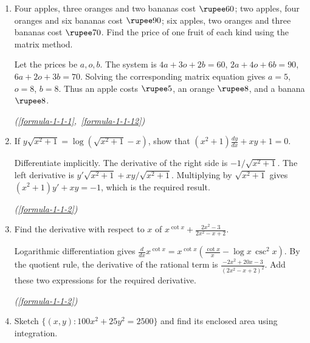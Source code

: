 \begin{enumerate}[label={},leftmargin=1.15cm,labelwidth=1.0cm,labelsep=0.15cm,itemindent=0pt,listparindent=0pt,itemsep=\baselineskip,parsep=0pt,topsep=0pt]
\item[5.1.32] Four apples, three oranges and two bananas cost $\rupee 60$; two apples, four oranges and six bananas cost $\rupee 90$; six apples, two oranges and three bananas cost $\rupee 70$. Find the price of one fruit of each kind using the matrix method.

\vspace{0.6em}\par\solution


Let the prices be $a,o,b$. The system is $4a+3o+2b=60$, $2a+4o+6b=90$, $6a+2o+3b=70$. Solving the corresponding matrix equation gives $a=5$, $o=8$, $b=8$. Thus an apple costs $\rupee 5$, an orange $\rupee 8$, and a banana $\rupee 8$.\par\noindent\hfill\mbox{\textit{(\ref{formula-1-1-1}, \ref{formula-1-1-12})}}\par

\item[5.1.33.1] If $y\sqrt{x^2+1}=\log(\sqrt{x^2+1}-x)$, show that $(x^2+1)\frac{dy}{dx}+xy+1=0$.

\vspace{0.6em}\par\solution


Differentiate implicitly. The derivative of the right side is $-1/\sqrt{x^2+1}$. The left derivative is $y'\sqrt{x^2+1}+xy/\sqrt{x^2+1}$. Multiplying by $\sqrt{x^2+1}$ gives $(x^2+1)y'+xy=-1$, which is the required result.\par\noindent\hfill\mbox{\textit{(\ref{formula-1-1-2})}}\par

\item[5.1.33.2] Find the derivative with respect to $x$ of $x^{\cot x}+\frac{2x^2-3}{2x^2-x+2}$.

\vspace{0.6em}\par\solution


Logarithmic differentiation gives $\frac{d}{dx}x^{\cot x}=x^{\cot x}(\frac{\cot x}{x}-\log x\,\csc^2x)$. By the quotient rule, the derivative of the rational term is $\frac{-2x^2+20x-3}{(2x^2-x+2)^2}$. Add these two expressions for the required derivative.\par\noindent\hfill\mbox{\textit{(\ref{formula-1-1-2})}}\par

\item[5.1.34] Sketch $\{(x,y):100x^2+25y^2=2500\}$ and find its enclosed area using integration.


\end{enumerate}

